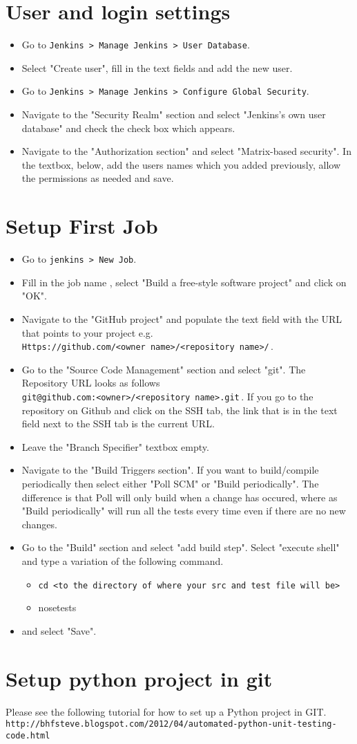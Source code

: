 \documentclass{article}
\begin{document}
\section{User and login settings}
\begin{itemize}
\item{Go to \verb#Jenkins > Manage Jenkins > User Database#.}
\item{Select "Create user", fill in the text fields and add the new user.}
\item{Go to \verb#Jenkins > Manage Jenkins > Configure Global Security#.}
\item{Navigate to the "Security Realm" section and select "Jenkins's own user database" and check the check box which appears.}
\item{Navigate to the "Authorization section" and select "Matrix-based security". In the textbox, below, add the users names which you added previously, allow the permissions as needed and save.}
\end{itemize}

\section{Setup First Job}
\begin{itemize}
\item{Go to \verb#jenkins > New Job#.}
\item{Fill in the job name , select "Build a free-style software project" and
click on "OK".}
\item{Navigate to the "GitHub project" and populate the text field with the URL that points to
your project e.g.\\\verb#Https://github.com/<owner name>/<repository name>/#\,.}
\item{Go to the "Source Code Management" section and select "git". The Repository URL looks as follows \\\verb#git@github.com:<owner>/<repository name>.git#\,.}
If you go to the repository on Github and click on the SSH tab, the link that is in the text field next to the SSH tab is the current URL.
\item{Leave the "Branch Specifier" textbox empty.}
\item{Navigate to the "Build Triggers section". If you want to build/compile periodically then select either "Poll SCM" or "Build periodically". The difference is that Poll will only build when a change has occured, where as "Build periodically" will run all the tests every time even if there are no new changes.}
\item{Go to the "Build" section and select "add build step". Select "execute shell" and type a variation of the following command.
\begin{itemize}
\item{\verb#cd <to the directory of where your src and test file will be>#}
\item nosetests   
\end{itemize}}
\item{and select "Save".}
\end{itemize}

\section{Setup python project in git}
Please see the following tutorial for how to set up a Python project in GIT. \\
\verb#http://bhfsteve.blogspot.com/2012/04/automated-python-unit-testing-code.html#
\end{document}

